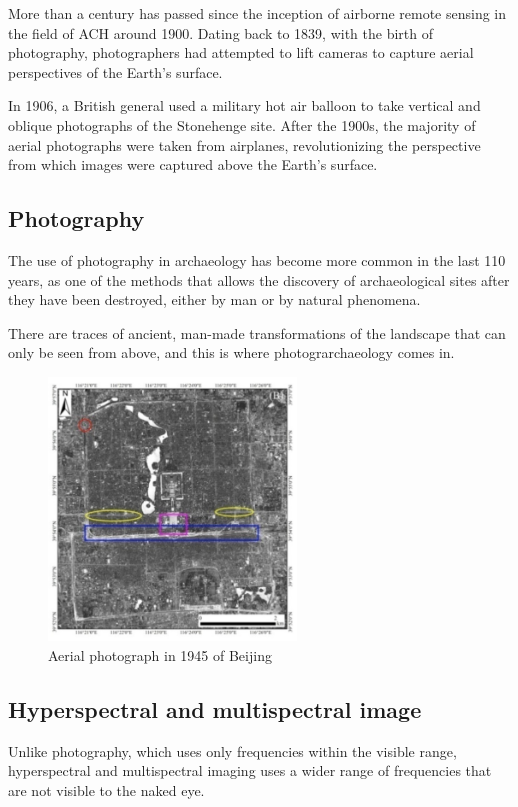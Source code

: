 More than a century has passed since the inception of airborne remote sensing in the field of ACH around 1900. Dating back to 1839, with the birth of photography, photographers had attempted to lift cameras to capture aerial perspectives of the Earth's surface.

In 1906, a British general used a military hot air balloon to take vertical and oblique photographs of the Stonehenge site. After the 1900s, the majority of aerial photographs were taken from airplanes, revolutionizing the perspective from which images were captured above the Earth's surface.


\subsection{Photography}
The use of photography in archaeology has become more common in the last 110 years, as one of the methods that allows the discovery of archaeological sites after they have been destroyed, either by man or by natural phenomena. 

There are traces of ancient, man-made transformations of the landscape that can only be seen from above, and this is where photograrchaeology comes in.

\begin{figure}[h]
\centering
\includegraphics[height=7cm]{images/foto.png}
\caption{Aerial photograph in 1945 of Beijing \cite{asmr}}
\end{figure}

\subsection{Hyperspectral and multispectral image}
Unlike photography, which uses only frequencies within the visible range, hyperspectral and multispectral imaging uses a wider range of frequencies that are not visible to the naked eye.


